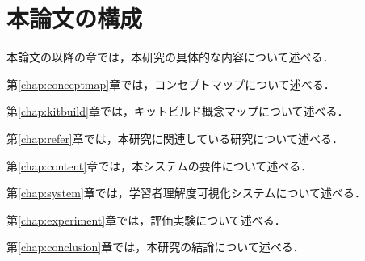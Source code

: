 \section{本論文の構成}
本論文の以降の章では，本研究の具体的な内容について述べる．

第\ref{chap:conceptmap}章では，コンセプトマップについて述べる．

第\ref{chap:kitbuild}章では，キットビルド概念マップについて述べる．

第\ref{chap:refer}章では，本研究に関連している研究について述べる．

第\ref{chap:content}章では，本システムの要件について述べる．

第\ref{chap:system}章では，学習者理解度可視化システムについて述べる．

第\ref{chap:experiment}章では，評価実験について述べる．

第\ref{chap:conclusion}章では，本研究の結論について述べる．
